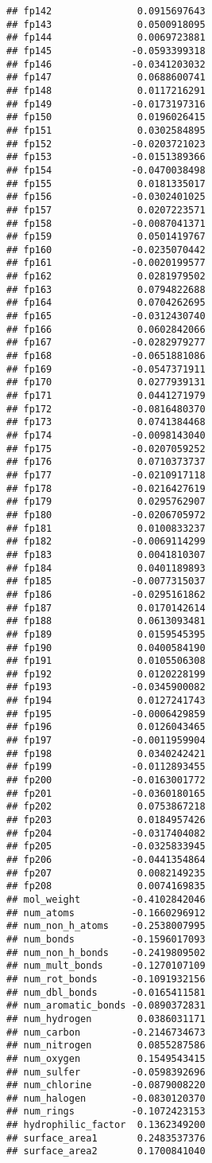 \documentclass[]{article}
\begin{document}
\begin{verbatim}
## fp142               0.0915697643
## fp143               0.0500918095
## fp144               0.0069723881
## fp145              -0.0593399318
## fp146              -0.0341203032
## fp147               0.0688600741
## fp148               0.0117216291
## fp149              -0.0173197316
## fp150               0.0196026415
## fp151               0.0302584895
## fp152              -0.0203721023
## fp153              -0.0151389366
## fp154              -0.0470038498
## fp155               0.0181335017
## fp156              -0.0302401025
## fp157               0.0207223571
## fp158              -0.0087041371
## fp159               0.0501419767
## fp160              -0.0235070442
## fp161              -0.0020199577
## fp162               0.0281979502
## fp163               0.0794822688
## fp164               0.0704262695
## fp165              -0.0312430740
## fp166               0.0602842066
## fp167              -0.0282979277
## fp168              -0.0651881086
## fp169              -0.0547371911
## fp170               0.0277939131
## fp171               0.0441271979
## fp172              -0.0816480370
## fp173               0.0741384468
## fp174              -0.0098143040
## fp175              -0.0207059252
## fp176               0.0710373737
## fp177              -0.0210917118
## fp178              -0.0216427619
## fp179               0.0295762907
## fp180              -0.0206705972
## fp181               0.0100833237
## fp182              -0.0069114299
## fp183               0.0041810307
## fp184               0.0401189893
## fp185              -0.0077315037
## fp186              -0.0295161862
## fp187               0.0170142614
## fp188               0.0613093481
## fp189               0.0159545395
## fp190               0.0400584190
## fp191               0.0105506308
## fp192               0.0120228199
## fp193              -0.0345900082
## fp194               0.0127241743
## fp195              -0.0006429859
## fp196               0.0126043465
## fp197              -0.0011959904
## fp198               0.0340242421
## fp199              -0.0112893455
## fp200              -0.0163001772
## fp201              -0.0360180165
## fp202               0.0753867218
## fp203               0.0184957426
## fp204              -0.0317404082
## fp205              -0.0325833945
## fp206              -0.0441354864
## fp207               0.0082149235
## fp208               0.0074169835
## mol_weight         -0.4102842046
## num_atoms          -0.1660296912
## num_non_h_atoms    -0.2538007995
## num_bonds          -0.1596017093
## num_non_h_bonds    -0.2419809502
## num_mult_bonds     -0.1270107109
## num_rot_bonds      -0.1091932156
## num_dbl_bonds      -0.0165411581
## num_aromatic_bonds -0.0890372831
## num_hydrogen        0.0386031171
## num_carbon         -0.2146734673
## num_nitrogen        0.0855287586
## num_oxygen          0.1549543415
## num_sulfer         -0.0598392696
## num_chlorine       -0.0879008220
## num_halogen        -0.0830120370
## num_rings          -0.1072423153
## hydrophilic_factor  0.1362349200
## surface_area1       0.2483537376
## surface_area2       0.1700841040
\end{verbatim}
\end{document}
